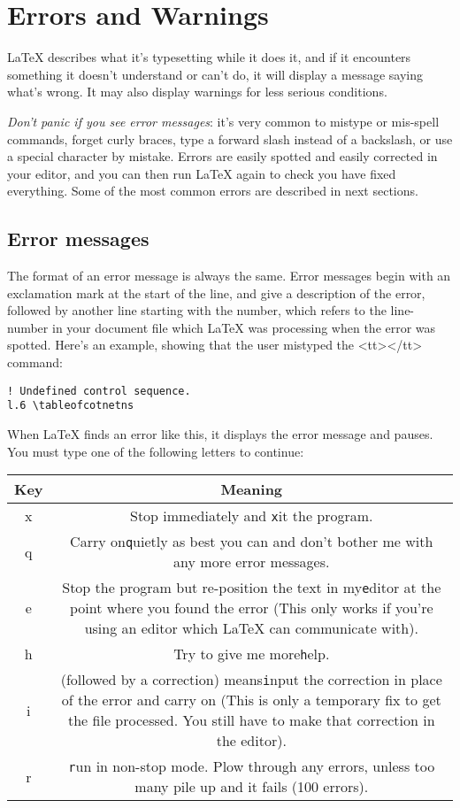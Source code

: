 \section{Errors and Warnings}
LaTeX describes what it's typesetting while it does it, and if it encounters
something it doesn't understand or can't do, it will display a message saying
what's wrong. It may also display warnings for less serious conditions.

\textit{Don't panic if you see error messages}: it's very common to mistype or
mis-spell commands, forget curly braces, type a forward slash instead of a
backslash, or use a special character by mistake. Errors are easily spotted and
easily corrected in your editor, and you can then run LaTeX again to check you
have fixed everything. Some of the most common errors are described in next
sections.

\subsection{Error messages} The format of an error message is always the same.
Error messages begin with an exclamation mark at the start of the line, and
give a description of the error, followed by another line starting with the
number, which refers to the line-number in your document file which LaTeX was
processing when the error was spotted. Here's an example, showing that the user
mistyped the <tt>\tableofcontents</tt>
command:


\begin{verbatim}
! Undefined control sequence.
l.6 \tableofcotnetns

\end{verbatim}

When LaTeX finds an error like this, it displays the error message and pauses. You must type one of the following letters to
continue:

\begin{tabular}{c c} \hline
Key 
& Meaning
\\ \hline
x
& Stop immediately and \texttt{x}it the program.
\\ \hline
q
& Carry on\texttt{q}uietly as best you can and don't bother me with any more error messages.
\\ \hline
e
& Stop the program but re-position the text in my\texttt{e}ditor at the point where you found the error (This only works if you're using an editor which LaTeX can communicate with).
\\ \hline
h
& Try to give me more\texttt{h}elp.
\\ \hline
i
& (followed by a correction) means\texttt{i}nput the correction in place of the error and carry on (This is only a temporary fix to get the file processed. You still have to make that correction in the editor).
\\ \hline
r
&\texttt{r}un in non-stop mode. Plow through any errors, unless too many pile up and it fails (100 errors).
\\ \hline
\end{tabular}

